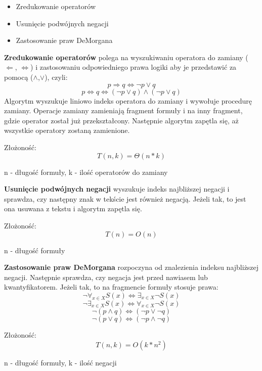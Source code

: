 ﻿\documentclass{article}
\begin{document}
\begin{itemize}
    \item Zredukowanie operatorów
    \item Usunięcie podwójnych negacji
    \item Zastosowanie praw DeMorgana
\end{itemize}

\par \textbf{Zredukowanie operatorów} polega na wyszukiwaniu operatora do zamiany ($\Leftarrow$, $\Leftrightarrow$) i zastosowaniu odpowiedniego prawa logiki aby je przedstawić za pomocą ($\wedge$,$\vee$), czyli:
    \[p \Rightarrow q \Leftrightarrow \neg p \vee q\]
    \[p \Leftrightarrow q \Leftrightarrow (\neg p \vee q) \wedge (\neg p \vee q)\]
Algorytm wyszukuje liniowo indeks operatora do zamiany i wywołuje procedurę zamiany. Operacje zamiany zamieniają fragment formuły i na inny fragment, gdzie operator został już przekształcony. Następnie algorytm zapętla się, aż wszystkie operatory zostaną zamienione.
\newline
\par Złożoność:
    \[T(n,k)=\Theta(n*k)\]
\begin{center}
n - długość formuły, k - ilość operatorów do zamiany
\end{center}

\newline
\par \textbf{Usunięcie podwójnych negacji} wyszukuje indeks najbliższej negacji i sprawdza, czy następny znak w tekście jest również negacją. Jeżeli tak, to jest ona usuwana z tekstu i algorytm zapętla się.
\newline
\par Złożoność:
    \[T(n)=O(n)\]
\begin{center}
n - długość formuły
\end{center}

\newline
\par \textbf{Zastosowanie praw DeMorgana} rozpoczyna od znalezienia indeksu najbliższej negacji. Następnie sprawdza, czy negacja jest przed nawiasem lub kwantyfikatorem. Jeżeli tak, to na fragmencie formuły stosuje prawa:
    \[\neg\forall _{x\in X} S(x) \Leftrightarrow \exists _{x\in X} \neg S(x)\]
    \[\neg\exists _{x\in X} S(x) \Leftrightarrow \forall _{x\in X} \neg S(x)\]
    \[\neg (p \wedge q) \Leftrightarrow (\neg p \vee \neg q)\]
    \[\neg (p \vee q) \Leftrightarrow (\neg p \wedge \neg q)\]
\newline
\par Złożoność:
    \[T(n,k)=O(k*n^2)\]
\begin{center}
n - długość formuły, k - ilość negacji
\end{center}
\end{document}

